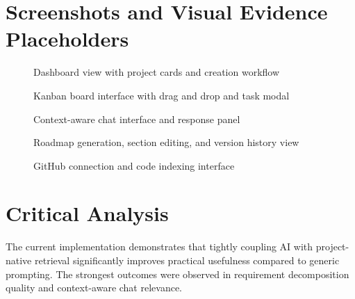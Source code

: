 \documentclass[a4paper, 11pt, oneside]{Dissertation}
\begin{document}
\FloatBarrier

\section{Screenshots and Visual Evidence Placeholders}
\begin{figure}[H]
\centering
{}
\caption{Dashboard view with project cards and creation workflow}
\label{fig:dashboard-screenshot}
\end{figure}

\begin{figure}[H]
\centering
{}
\caption{Kanban board interface with drag and drop and task modal}
\label{fig:kanban-screenshot}
\end{figure}

\begin{figure}[H]
\centering
{}
\caption{Context-aware chat interface and response panel}
\label{fig:chat-screenshot}
\end{figure}

\begin{figure}[H]
\centering
{}
\caption{Roadmap generation, section editing, and version history view}
\label{fig:roadmap-screenshot}
\end{figure}

\begin{figure}[H]
\centering
{}
\caption{GitHub connection and code indexing interface}
\label{fig:github-screenshot}
\end{figure}

\FloatBarrier

\section{Critical Analysis}
The current implementation demonstrates that tightly coupling AI with project-native retrieval significantly improves practical usefulness compared to generic prompting. The strongest outcomes were observed in requirement decomposition quality and context-aware chat relevance.
\end{document}
